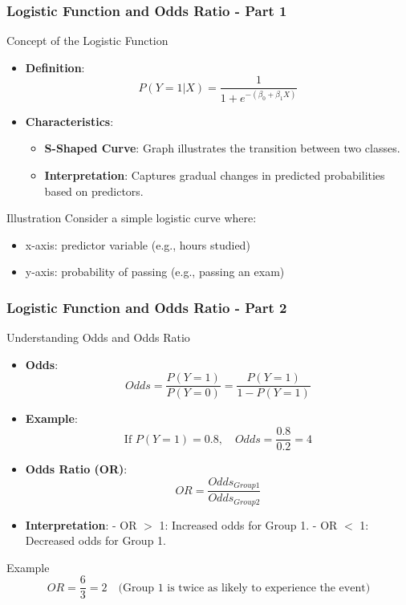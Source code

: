 \documentclass[aspectratio=169]{beamer}
\begin{document}
\begin{frame}[fragile]
    \frametitle{Logistic Function and Odds Ratio - Part 1}
    
    \begin{block}{Concept of the Logistic Function}
        \begin{itemize}
            \item \textbf{Definition}: 
            \[
            P(Y=1 | X) = \frac{1}{1 + e^{-(\beta_0 + \beta_1 X)}}
            \]
            \item \textbf{Characteristics}:
            \begin{itemize}
                \item \textbf{S-Shaped Curve}: Graph illustrates the transition between two classes.
                \item \textbf{Interpretation}: Captures gradual changes in predicted probabilities based on predictors.
            \end{itemize}
        \end{itemize}
    \end{block}
    
    \begin{block}{Illustration}
        Consider a simple logistic curve where:
        \begin{itemize}
            \item x-axis: predictor variable (e.g., hours studied)
            \item y-axis: probability of passing (e.g., passing an exam)
        \end{itemize}
    \end{block}
\end{frame}

\begin{frame}[fragile]
    \frametitle{Logistic Function and Odds Ratio - Part 2}
    
    \begin{block}{Understanding Odds and Odds Ratio}
        \begin{itemize}
            \item \textbf{Odds}:
            \[
            Odds = \frac{P(Y=1)}{P(Y=0)} = \frac{P(Y=1)}{1 - P(Y=1)}
            \]
            \item \textbf{Example}:
            \[
            \text{If } P(Y=1) = 0.8, \quad Odds = \frac{0.8}{0.2} = 4
            \]
            \item \textbf{Odds Ratio (OR)}:
            \[
            OR = \frac{Odds_{Group1}}{Odds_{Group2}}
            \]
            \item \textbf{Interpretation}: 
            - OR $>$ 1: Increased odds for Group 1.
            - OR $<$ 1: Decreased odds for Group 1.
        \end{itemize}
    \end{block}
    
    \begin{block}{Example}
        \[
        OR = \frac{6}{3} = 2 \quad \text{(Group 1 is twice as likely to experience the event)}
        \]
    \end{block}
\end{frame}
\end{document}
